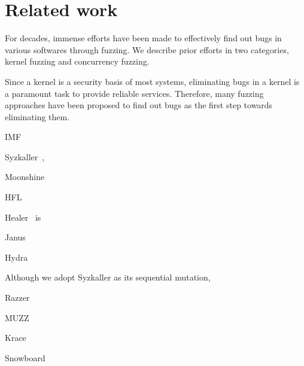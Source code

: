 \section{Related work}
\label{s:relwk}

For decades, immense efforts have been made to effectively find out
bugs in various softwares through fuzzing. We describe prior efforts
in two categories, kernel fuzzing and concurrency fuzzing.

%
Since a kernel is a security basis of most systems, eliminating bugs
in a kernel is a paramount task to provide reliable
services. Therefore, many fuzzing approaches have been proposed to
find out bugs as the first step towards eliminating them.
%

IMF~\cite{imf}

Syzkaller~\cite{syzkaller},

Moonshine~\cite{moonshine}

HFL~\cite{hfl}

Healer~\cite{healer} is

Janus~\cite{janus}

Hydra~\cite{hydra}


Although we adopt Syzkaller as its sequential mutation, 


Razzer~\cite{razzer}

MUZZ~\cite{muzz}

Krace~\cite{krace}

Snowboard~\cite{snowboard}



